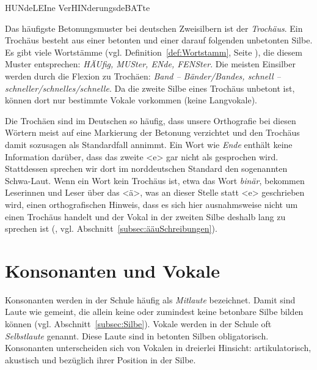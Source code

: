 \ea
\ea \label{ex:Hundeleine} HUNdeLEIne 
\ex \label{ex:Verhinderungsdebatte} VerHINderungsdeBATte 
\z 
\z


Das häufigste Betonungsmuster bei deutschen Zweisilbern ist der \textit{Trochäus}. Ein Trochäus besteht aus einer betonten und einer darauf folgenden unbetonten Silbe. Es gibt viele Wortstämme (vgl. Definition~\ref{def:Wortstamm}, Seite \pageref{def:Wortstamm}), die diesem Muster entsprechen: \textit{HÄUfig, MUSter, ENde, FENSter}. Die meisten Einsilber werden durch die Flexion zu Trochäen: \textit{Band -- Bänder/Bandes, schnell -- schneller/schnelles/schnelle}. Da die zweite Silbe eines Trochäus unbetont ist, können dort nur bestimmte Vokale vorkommen (\zB keine Langvokale). 

Die Trochäen sind im Deutschen so häufig, dass unsere Orthografie bei diesen Wörtern meist auf eine Markierung der Betonung verzichtet und den Trochäus damit sozusagen als Standardfall annimmt. Ein Wort wie \textit{Ende} enthält \zB keine Information darüber, dass das zweite <e> gar nicht als \textipa{[e]} gesprochen wird. Stattdessen sprechen wir dort im norddeutschen Standard den sogenannten Schwa-Laut. Wenn ein Wort kein Trochäus ist, etwa das Wort \textit{binär}, bekommen Leserinnen und Leser über das <ä>, was an dieser Stelle statt <e> geschrieben wird, einen orthografischen Hinweis, dass es sich hier ausnahmsweise nicht um einen Trochäus handelt und der Vokal in der zweiten Silbe deshalb lang zu sprechen ist (\cite[231--232]{FuhrhopPeters2013}, vgl. Abschnitt~\ref{subsec:ääuSchreibungen}).

\section{Konsonanten und Vokale}\label{sec:KonsonantenundVokale}

Konsonanten werden in der Schule häufig als \textit{Mitlaute} bezeichnet. Damit sind Laute wie \textipa{[s, l, p]} gemeint, die allein keine oder zumindest keine betonbare Silbe bilden können (vgl. Abschnitt~\ref{subsec:Silbe}). Vokale werden in der Schule oft \textit{Selbstlaute} genannt. Diese Laute sind in betonten Silben obligatorisch. Konsonanten unterscheiden sich von Vokalen in dreierlei Hinsicht: artikulatorisch, akustisch und bezüglich ihrer Position in der Silbe.

